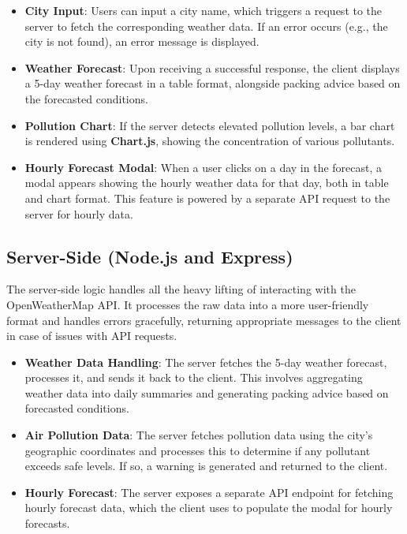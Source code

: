 \documentclass{article}
\begin{document}
\begin{itemize}
    \item \textbf{City Input}: Users can input a city name, which triggers a request to the server to fetch the corresponding weather data. If an error occurs (e.g., the city is not found), an error message is displayed.
    
    \item \textbf{Weather Forecast}: Upon receiving a successful response, the client displays a 5-day weather forecast in a table format, alongside packing advice based on the forecasted conditions.
    
    \item \textbf{Pollution Chart}: If the server detects elevated pollution levels, a bar chart is rendered using \textbf{Chart.js}, showing the concentration of various pollutants.

    \item \textbf{Hourly Forecast Modal}: When a user clicks on a day in the forecast, a modal appears showing the hourly weather data for that day, both in table and chart format. This feature is powered by a separate API request to the server for hourly data.
\end{itemize}

\subsection*{Server-Side (Node.js and Express)}

The server-side logic handles all the heavy lifting of interacting with the OpenWeatherMap API. It processes the raw data into a more user-friendly format and handles errors gracefully, returning appropriate messages to the client in case of issues with API requests.

\begin{itemize}
    \item \textbf{Weather Data Handling}: The server fetches the 5-day weather forecast, processes it, and sends it back to the client. This involves aggregating weather data into daily summaries and generating packing advice based on forecasted conditions.

    \item \textbf{Air Pollution Data}: The server fetches pollution data using the city’s geographic coordinates and processes this to determine if any pollutant exceeds safe levels. If so, a warning is generated and returned to the client.

    \item \textbf{Hourly Forecast}: The server exposes a separate API endpoint for fetching hourly forecast data, which the client uses to populate the modal for hourly forecasts.
\end{itemize}
\end{document}
